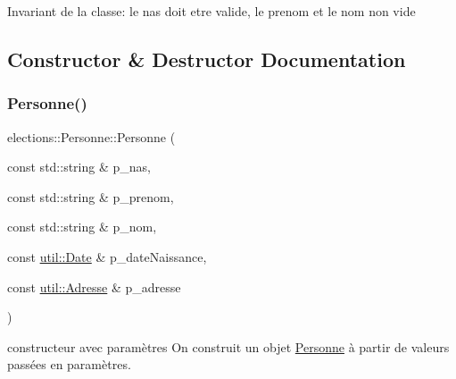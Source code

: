 \begin{DoxyInvariant}{Invariant}
de la classe\+: le nas doit etre valide, le prenom et le nom non vide 
\end{DoxyInvariant}


\subsection{Constructor \& Destructor Documentation}
\mbox{\label{classelections_1_1Personne_a25e4a5ff2a6b2fd79d146510b0d4622f}} 
\subsubsection{\texorpdfstring{Personne()}{Personne()}}
{\footnotesize\ttfamily elections\+::\+Personne\+::\+Personne (\begin{DoxyParamCaption}\item[{const std\+::string \&}]{p\+\_\+nas,  }\item[{const std\+::string \&}]{p\+\_\+prenom,  }\item[{const std\+::string \&}]{p\+\_\+nom,  }\item[{const \hyperlink{classutil_1_1Date}{util\+::\+Date} \&}]{p\+\_\+date\+Naissance,  }\item[{const \hyperlink{classutil_1_1Adresse}{util\+::\+Adresse} \&}]{p\+\_\+adresse }\end{DoxyParamCaption})}



constructeur avec paramètres On construit un objet \hyperlink{classelections_1_1Personne}{Personne} à partir de valeurs passées en paramètres. 


